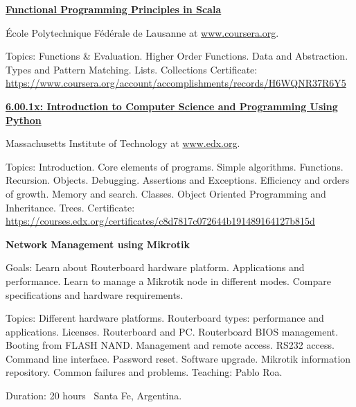 \documentclass[letterpaper,MMMyyyy,nonstop]{simpleresumecv}
\begin{document}
\begin{body}
\BigGap
\href{https://www.coursera.org/learn/progfun1}{\textbf{Functional Programming Principles in Scala}}
\hfill
{}

\BulletItem École Polytechnique Fédérale de Lausanne at \href{https://www.coursera.org/}{www.coursera.org}.
\begin{detail}
	\SubBulletItem
	Topics: Functions \& Evaluation. Higher Order Functions. Data and Abstraction. Types and Pattern Matching. Lists. Collections
	\SubBulletItem
	Certificate: \href{https://www.coursera.org/account/accomplishments/records/H6WQNR37R6Y5}
	{https://www.coursera.org/account/accomplishments/records/H6WQNR37R6Y5}
	
\end{detail}


\BigGap
\href{https://www.edx.org/course/introduction-to-computer-science-and-programming-using-python}{\textbf{6.00.1x: Introduction to Computer Science and Programming Using Python}}
\hfill
{}

\BulletItem Massachusetts Institute of Technology at \href{http://www.edx.org/}{www.edx.org}.
\begin{detail}
	\SubBulletItem
	Topics: Introduction. Core elements of programs. Simple algorithms. Functions. Recursion. Objects. Debugging. Assertions and Exceptions. Efficiency and orders of growth. Memory and search. Classes. Object Oriented Programming	and Inheritance. Trees.
	\SubBulletItem
	Certificate: \href{https://courses.edx.org/certificates/c8d7817c072644b191489164127b815d}
	{https://courses.edx.org/certificates/c8d7817c072644b191489164127b815d}
	
\end{detail}


\BigGap
\textbf{Network Management using Mikrotik}
\hfill
{}

\BulletItem Goals: Learn about Routerboard hardware platform. Applications and performance. Learn to manage a Mikrotik node in different modes. Compare specifications and hardware requirements.
\begin{detail}
	\SubBulletItem 
	Topics: Different hardware platforms. Routerboard types: performance and applications. Licenses. Routerboard and PC. Routerboard BIOS management. Booting from FLASH NAND. Management and remote access. RS232 access. Command line interface. Password reset. Software upgrade. Mikrotik information repository. Common failures and problems.
	\SubBulletItem Teaching: Pablo Roa.
\end{detail}
Duration: 20 hours \SubBulletSymbol\, Santa Fe, Argentina.



\end{body}
\end{document}
